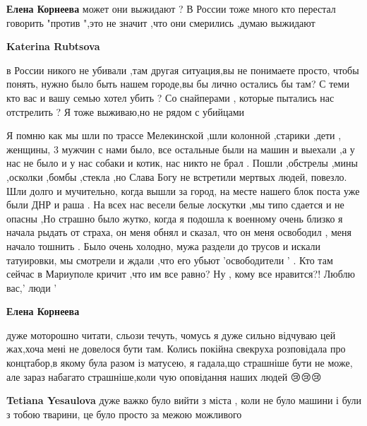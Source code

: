 \begin{itemize} %
\textbf{Елена Корнеева} может они выжидают ? В России тоже много кто перестал говорить "против ",это не значит ,что они смерились ,думаю выжидают

\textbf{Katerina Rubtsova} 

в России никого не убивали ,там другая ситуация,вы не понимаете просто, чтобы
понять, нужно было быть нашем городе,вы бы лично остались бы там? С теми кто
вас и вашу семью хотел убить ? Со снайперами , которые пытались нас отстрелить
? Я тоже выживаю,но не рядом с убийцами

\end{itemize} %


Я помню как мы шли по трассе Мелекинской ,шли колонной ,старики ,дети ,
женщины, 3 мужчин с нами было, все остальные были на машин и выехали ,а у нас не
было и у нас собаки и котик, нас никто не брал . Пошли ,обстрелы ,мины ,осколки
,бомбы ,стекла ,но Слава Богу не встретили мертвых людей, повезло. Шли долго и
мучительно, когда вышли за город, на месте нашего блок поста уже были ДНР и
раша . На всех нас весели белые лоскутки ,мы типо сдается и не опасны ,Но
страшно было жутко, когда я подошла к военному очень близко я начала рыдать от
страха, он меня обнял и сказал, что он меня освободил , меня начало тошнить .
Было очень холодно, мужа раздели до трусов и искали татуировки, мы смотрели и
ждали ,что его убьют 'освободители ' . Кто там сейчас в Мариуполе кричит ,что
им все равно? Ну , кому все нравится?! Люблю вас,' люди '

\begin{itemize} %
\textbf{Елена Корнеева} 

дуже моторошно читати, сльози течуть, чомусь я дуже сильно відчуваю цей
жах,хоча мені не довелося бути там. Колись покійна свекруха розповідала про
концтабор,в якому була разом із матусею, я гадала,що страшніше бути не може,
але зараз набагато страшніше,коли чую оповідання наших людей 😢😢😢

\textbf{Tetiana Yesaulova} дуже важко було вийти з міста , коли не було машини і були з тобою тварини, це було просто за межою можливого
\end{itemize} %
